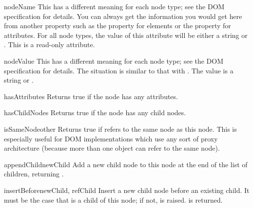 \begin{memberdesc}[Node]{nodeName}
This has a different meaning for each node type; see the DOM
specification for details.  You can always get the information you
would get here from another property such as the 
property for elements or the  property for attributes.
For all node types, the value of this attribute will be either a
string or .  This is a read-only attribute.
\end{memberdesc}

\begin{memberdesc}[Node]{nodeValue}
This has a different meaning for each node type; see the DOM
specification for details.  The situation is similar to that with
.  The value is a string or .
\end{memberdesc}

\begin{methoddesc}[Node]{hasAttributes}{}
Returns true if the node has any attributes.
\end{methoddesc}

\begin{methoddesc}[Node]{hasChildNodes}{}
Returns true if the node has any child nodes.
\end{methoddesc}

\begin{methoddesc}[Node]{isSameNode}{other}
Returns true if  refers to the same node as this node.
This is especially useful for DOM implementations which use any sort
of proxy architecture (because more than one object can refer to the
same node).

\end{methoddesc}

\begin{methoddesc}[Node]{appendChild}{newChild}
Add a new child node to this node at the end of the list of children,
returning .
\end{methoddesc}

\begin{methoddesc}[Node]{insertBefore}{newChild, refChild}
Insert a new child node before an existing child.  It must be the case
that  is a child of this node; if not,
 is raised.   is returned.
\end{methoddesc}


